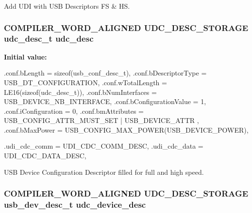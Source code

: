 \-Add \-U\-D\-I with \-U\-S\-B \-Descriptors \-F\-S \& \-H\-S. 

\hypertarget{group__udi__cdc__group__desc_ga786079ecd77f4d55ac99cc5f49e0fde7}{
\subsubsection[{udc\-\_\-desc}]{\setlength{\rightskip}{0pt plus 5cm}\-C\-O\-M\-P\-I\-L\-E\-R\-\_\-\-W\-O\-R\-D\-\_\-\-A\-L\-I\-G\-N\-E\-D \-U\-D\-C\-\_\-\-D\-E\-S\-C\-\_\-\-S\-T\-O\-R\-A\-G\-E {\bf udc\-\_\-desc\-\_\-t} {\bf udc\-\_\-desc}}}
\label{group__udi__cdc__group__desc_ga786079ecd77f4d55ac99cc5f49e0fde7}
{\bfseries \-Initial value\-:}
\begin{DoxyCode}
 {
        .conf.bLength              = sizeof(usb_conf_desc_t),
        .conf.bDescriptorType      = USB_DT_CONFIGURATION,
        .conf.wTotalLength         = LE16(sizeof(udc_desc_t)),
        .conf.bNumInterfaces       = USB_DEVICE_NB_INTERFACE,
        .conf.bConfigurationValue  = 1,
        .conf.iConfiguration       = 0,
        .conf.bmAttributes         = USB_CONFIG_ATTR_MUST_SET | USB_DEVICE_ATTR
      ,
        .conf.bMaxPower            = USB_CONFIG_MAX_POWER(USB_DEVICE_POWER),



        .udi_cdc_comm              = UDI_CDC_COMM_DESC,
        .udi_cdc_data              = UDI_CDC_DATA_DESC,
}
\end{DoxyCode}


\-U\-S\-B \-Device \-Configuration \-Descriptor filled for full and high speed. 

\hypertarget{group__udi__cdc__group__desc_ga9b0e293c7d3236bf90c42d808c2bc1ab}{
\subsubsection[{udc\-\_\-device\-\_\-desc}]{\setlength{\rightskip}{0pt plus 5cm}\-C\-O\-M\-P\-I\-L\-E\-R\-\_\-\-W\-O\-R\-D\-\_\-\-A\-L\-I\-G\-N\-E\-D \-U\-D\-C\-\_\-\-D\-E\-S\-C\-\_\-\-S\-T\-O\-R\-A\-G\-E {\bf usb\-\_\-dev\-\_\-desc\-\_\-t} {\bf udc\-\_\-device\-\_\-desc}}}
\label{group__udi__cdc__group__desc_ga9b0e293c7d3236bf90c42d808c2bc1ab}


